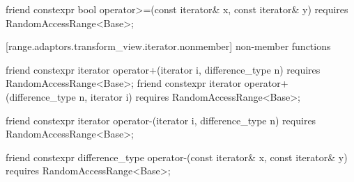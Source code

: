 \begin{itemdescr}
\pnum
\oldtxt{\returns} 
\end{itemdescr}

%
\begin{itemdecl}
friend constexpr bool operator>=(const iterator& x, const iterator& y)
  requires RandomAccessRange<Base>;
\end{itemdecl}

\begin{itemdescr}
\pnum
\oldtxt{\returns} 
\end{itemdescr}

[range.adaptors.transform_view.iterator.nonmember]{ non-member functions}

\begin{itemdecl}
friend constexpr iterator operator+(iterator i, difference_type n)
  requires RandomAccessRange<Base>;
friend constexpr iterator operator+(difference_type n, iterator i)
  requires RandomAccessRange<Base>;
\end{itemdecl}

\begin{itemdescr}
\pnum
\oldtxt{\returns} 
\end{itemdescr}

%
\begin{itemdecl}
friend constexpr iterator operator-(iterator i, difference_type n)
  requires RandomAccessRange<Base>;
\end{itemdecl}

\begin{itemdescr}
\pnum
\oldtxt{\returns} 
\end{itemdescr}

%
\begin{itemdecl}
friend constexpr difference_type operator-(const iterator& x, const iterator& y)
  requires RandomAccessRange<Base>;
\end{itemdecl}

